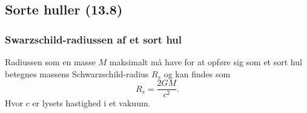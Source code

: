 \subsection{Sorte huller (13.8)}

\subsubsection{Swarzschild-radiussen af et sort hul}
Radiussen som en masse $M$ maksimalt må have for at opføre sig som et sort hul betegnes massens Schwarz\-schild-radius $R_s$ og kan findes som
\[ 
R_s = \frac{2GM}{c^2}
.\]
Hvor $c$ er lysets hastighed i et vakuum.

